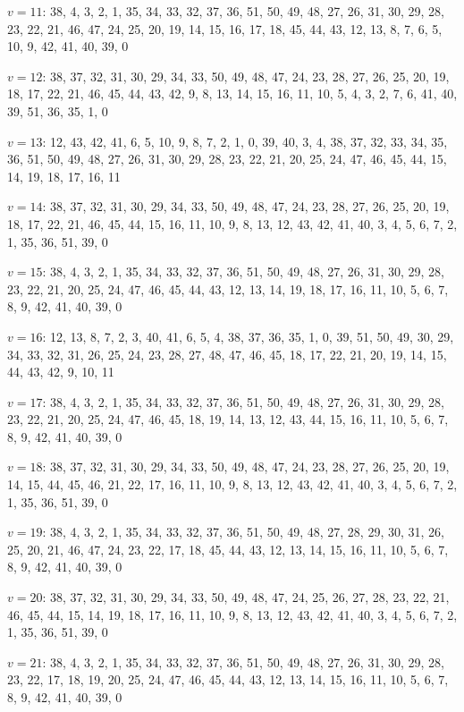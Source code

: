\documentclass{amcjoucc}
\begin{document}
\begin{itemize}
{\item $v = 11$: 38, 4, 3, 2, 1, 35, 34, 33, 32, 37, 36, 51, 50, 49, 48, 27, 26, 31, 30, 29, 28, 23, 22, 21, 46, 47, 24, 25, 20, 19, 14, 15, 16, 17, 18, 45, 44, 43, 12, 13, 8, 7, 6, 5, 10, 9, 42, 41, 40, 39, 0
\item $v = 12$: 38, 37, 32, 31, 30, 29, 34, 33, 50, 49, 48, 47, 24, 23, 28, 27, 26, 25, 20, 19, 18, 17, 22, 21, 46, 45, 44, 43, 42, 9, 8, 13, 14, 15, 16, 11, 10, 5, 4, 3, 2, 7, 6, 41, 40, 39, 51, 36, 35, 1, 0
\item $v = 13$: 12, 43, 42, 41, 6, 5, 10, 9, 8, 7, 2, 1, 0, 39, 40, 3, 4, 38, 37, 32, 33, 34, 35, 36, 51, 50, 49, 48, 27, 26, 31, 30, 29, 28, 23, 22, 21, 20, 25, 24, 47, 46, 45, 44, 15, 14, 19, 18, 17, 16, 11
\item $v = 14$: 38, 37, 32, 31, 30, 29, 34, 33, 50, 49, 48, 47, 24, 23, 28, 27, 26, 25, 20, 19, 18, 17, 22, 21, 46, 45, 44, 15, 16, 11, 10, 9, 8, 13, 12, 43, 42, 41, 40, 3, 4, 5, 6, 7, 2, 1, 35, 36, 51, 39, 0
\item $v = 15$: 38, 4, 3, 2, 1, 35, 34, 33, 32, 37, 36, 51, 50, 49, 48, 27, 26, 31, 30, 29, 28, 23, 22, 21, 20, 25, 24, 47, 46, 45, 44, 43, 12, 13, 14, 19, 18, 17, 16, 11, 10, 5, 6, 7, 8, 9, 42, 41, 40, 39, 0
\item $v = 16$: 12, 13, 8, 7, 2, 3, 40, 41, 6, 5, 4, 38, 37, 36, 35, 1, 0, 39, 51, 50, 49, 30, 29, 34, 33, 32, 31, 26, 25, 24, 23, 28, 27, 48, 47, 46, 45, 18, 17, 22, 21, 20, 19, 14, 15, 44, 43, 42, 9, 10, 11
\item $v = 17$: 38, 4, 3, 2, 1, 35, 34, 33, 32, 37, 36, 51, 50, 49, 48, 27, 26, 31, 30, 29, 28, 23, 22, 21, 20, 25, 24, 47, 46, 45, 18, 19, 14, 13, 12, 43, 44, 15, 16, 11, 10, 5, 6, 7, 8, 9, 42, 41, 40, 39, 0
\item $v = 18$: 38, 37, 32, 31, 30, 29, 34, 33, 50, 49, 48, 47, 24, 23, 28, 27, 26, 25, 20, 19, 14, 15, 44, 45, 46, 21, 22, 17, 16, 11, 10, 9, 8, 13, 12, 43, 42, 41, 40, 3, 4, 5, 6, 7, 2, 1, 35, 36, 51, 39, 0
\item $v = 19$: 38, 4, 3, 2, 1, 35, 34, 33, 32, 37, 36, 51, 50, 49, 48, 27, 28, 29, 30, 31, 26, 25, 20, 21, 46, 47, 24, 23, 22, 17, 18, 45, 44, 43, 12, 13, 14, 15, 16, 11, 10, 5, 6, 7, 8, 9, 42, 41, 40, 39, 0
\item $v = 20$: 38, 37, 32, 31, 30, 29, 34, 33, 50, 49, 48, 47, 24, 25, 26, 27, 28, 23, 22, 21, 46, 45, 44, 15, 14, 19, 18, 17, 16, 11, 10, 9, 8, 13, 12, 43, 42, 41, 40, 3, 4, 5, 6, 7, 2, 1, 35, 36, 51, 39, 0
\item $v = 21$: 38, 4, 3, 2, 1, 35, 34, 33, 32, 37, 36, 51, 50, 49, 48, 27, 26, 31, 30, 29, 28, 23, 22, 17, 18, 19, 20, 25, 24, 47, 46, 45, 44, 43, 12, 13, 14, 15, 16, 11, 10, 5, 6, 7, 8, 9, 42, 41, 40, 39, 0
}
\end{itemize}
\end{document}
